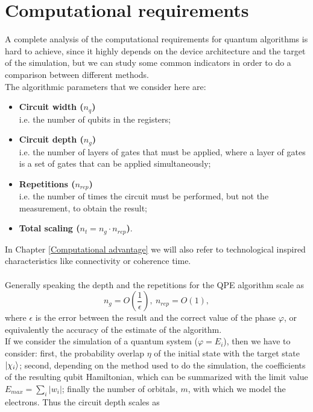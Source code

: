 \section{Computational requirements}
A complete analysis of the computational requirements for quantum algorithms is hard to achieve, since it highly depends on the device architecture and the target of the simulation, but we can study some common indicators in order to do a comparison between different methods. \\
The algorithmic parameters that we consider here are:
\begin{itemize}
    \item \textbf{Circuit width ($n_q$)} \\
    i.e. the number of qubits in the registers;
    
    \item \textbf{Circuit depth ($n_g$)} \\
    i.e. the number of layers of gates that must be applied, where a layer of gates is a set of gates that can be applied simultaneously;
    
    \item \textbf{Repetitions ($n_{rep}$)} \\
    i.e. the number of times the circuit must be performed, but not the measurement, to obtain the result;
    
    \item \textbf{Total scaling ($n_t = n_g \cdot n_{rep}$)}.
\end{itemize}
In Chapter \ref{Computational advantage} we will also refer to technological inspired characteristics like connectivity or coherence time. \\
\\
Generally speaking the depth and the repetitions for the QPE algorithm scale as
\begin{equation}
    n_g = O\left(\frac{1}{\epsilon}\right), \ n_{rep} = O(1),
\end{equation}
where $\epsilon$ is the error between the result and the correct value of the phase $\varphi$, or equivalently the accuracy of the estimate of the algorithm. \\
If we consider the simulation of a quantum system ($\varphi = E_i$), then we have to consider: first, the probability overlap $\eta$ of the initial state with the target state $\ket{\chi_i}$; second, depending on the method used to do the simulation, the coefficients of the resulting qubit Hamiltonian, which can be summarized with the limit value $E_{max} = \sum_i |w_i|$; finally the number of orbitals, $m$, with which we model the electrons. Thus the circuit depth scales as
